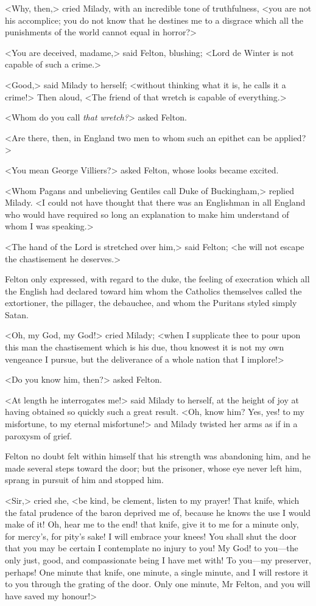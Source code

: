 <Why, then,> cried Milady, with an incredible tone of truthfulness, <you are not his accomplice; you do not know that he destines me to a disgrace which all the punishments of the world cannot equal in horror?> 

<You are deceived, madame,> said Felton, blushing; <Lord de Winter is not capable of such a crime.> 

<Good,> said Milady to herself; <without thinking what it is, he calls it a crime!> Then aloud, <The friend of that wretch is capable of everything.> 

<Whom do you call \emph{that wretch?}> asked Felton. 

<Are there, then, in England two men to whom such an epithet can be applied?> 

<You mean George Villiers?> asked Felton, whose looks became excited. 

<Whom Pagans and unbelieving Gentiles call Duke of Buckingham,> replied Milady. <I could not have thought that there was an Englishman in all England who would have required so long an explanation to make him understand of whom I was speaking.> 

<The hand of the Lord is stretched over him,> said Felton; <he will not escape the chastisement he deserves.> 

Felton only expressed, with regard to the duke, the feeling of execration which all the English had declared toward him whom the Catholics themselves called the extortioner, the pillager, the debauchee, and whom the Puritans styled simply Satan. 

<Oh, my God, my God!> cried Milady; <when I supplicate thee to pour upon this man the chastisement which is his due, thou knowest it is not my own vengeance I pursue, but the deliverance of a whole nation that I implore!> 

<Do you know him, then?> asked Felton. 

<At length he interrogates me!> said Milady to herself, at the height of joy at having obtained so quickly such a great result. <Oh, know him? Yes, yes! to my misfortune, to my eternal misfortune!> and Milady twisted her arms as if in a paroxysm of grief. 

Felton no doubt felt within himself that his strength was abandoning him, and he made several steps toward the door; but the prisoner, whose eye never left him, sprang in pursuit of him and stopped him. 

<Sir,> cried she, <be kind, be clement, listen to my prayer! That knife, which the fatal prudence of the baron deprived me of, because he knows the use I would make of it! Oh, hear me to the end! that knife, give it to me for a minute only, for mercy's, for pity's sake! I will embrace your knees! You shall shut the door that you may be certain I contemplate no injury to you! My God! to you—the only just, good, and compassionate being I have met with! To you—my preserver, perhaps! One minute that knife, one minute, a single minute, and I will restore it to you through the grating of the door. Only one minute, Mr Felton, and you will have saved my honour!> 

